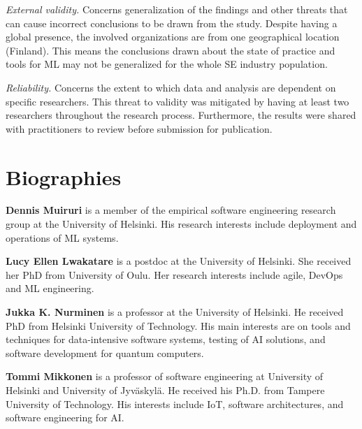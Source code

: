 \documentclass{IEEEcsmag}
\begin{document}
\textit{External validity.} Concerns generalization of the findings and other threats that can cause incorrect conclusions to be drawn from the study. Despite having a global presence, the involved organizations are from one geographical location (Finland). This means the conclusions drawn about the state of practice and tools for ML may not be generalized for the whole SE industry population. 

\textit{Reliability.} Concerns the extent to which data and analysis are dependent on specific researchers. This threat to validity was mitigated by having at least two researchers throughout the research process. Furthermore, the results were shared with practitioners to review before submission for publication.











 









\small


\section*{\textbf{Biographies}}
\label{sec:biographies}
\textbf{Dennis Muiruri} is a member of the empirical software engineering research group at the University of Helsinki. His research interests include deployment and operations of ML systems.

\textbf{Lucy Ellen Lwakatare} is a postdoc at the University of Helsinki. She received her PhD from University of Oulu.
Her research interests include agile, DevOps and ML engineering.

\textbf{Jukka K. Nurminen} is a professor at the University of Helsinki. 
He received PhD from Helsinki University of Technology. His main interests are on tools and techniques for data-intensive software systems, testing of AI solutions, and software development for quantum computers.

\textbf{Tommi Mikkonen} is a professor of software engineering at University of Helsinki and University of Jyv\"{a}skyl\"{a}. He received his Ph.D. from Tampere University of Technology. His interests include IoT, software architectures, and software engineering for AI.
 
\end{document}
